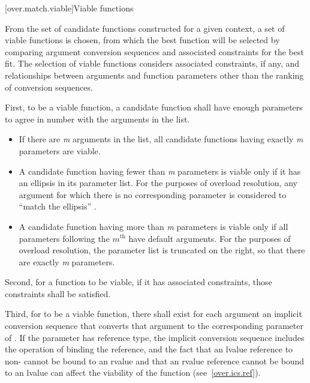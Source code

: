 %

[over.match.viable]{Viable functions}%

\pnum
From the set of candidate functions constructed for a given
context, a set of viable functions is
chosen, from which the best function will be selected by
comparing argument conversion sequences
and associated constraints
for the best fit.
The selection of viable functions considers
associated constraints, if any, and
relationships between arguments and function parameters other
than the ranking of conversion sequences.

\pnum
{}%
%
First, to be a viable function, a candidate function shall have
enough parameters to agree in number with the arguments in the
list.

\begin{itemize}
\item
If there are
\textit{m}
arguments in the list, all candidate
functions having exactly
\textit{m}
parameters are viable.
\item
A candidate function having fewer than
\textit{m}
parameters is
viable only if it has an ellipsis in its parameter list.
For the purposes of overload resolution,
any argument for which there is no corresponding parameter is
considered to ``match the ellipsis'' .
\item
A candidate function having more than
\textit{m}
parameters is viable
only if all parameters following the $m^\text{th}$
have default arguments.
For the purposes of overload
resolution, the parameter list is truncated on the right, so
that there are exactly
\textit{m}
parameters.
\end{itemize}

\pnum
Second, for a function to be viable, if it has associated constraints,
those constraints shall be satisfied.

\pnum
Third, for
to be a viable function, there shall exist for each
argument an
implicit conversion sequence that
converts that argument to the corresponding parameter of
.
If the parameter has reference type, the implicit conversion sequence
includes the operation of binding the reference, and the fact that
an lvalue reference to non- cannot be bound to an rvalue
and that an rvalue reference cannot be bound to an lvalue
can affect
the viability of the function (see~\ref{over.ics.ref}).

